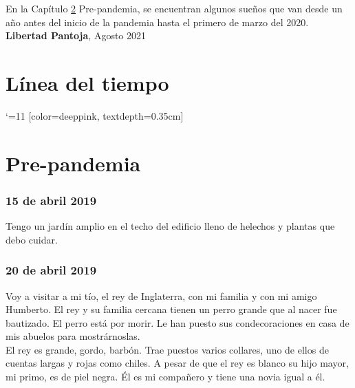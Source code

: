 \documentclass[12pt]{book}
\begin{document}
En la Capítulo \ref{prepandemia} Pre-pandemia, se encuentran algunos sueños que van desde un año antes del inicio de la pandemia hasta el primero de marzo del 2020. 
\vfill
\hfill {\textbf{Libertad Pantoja}, Agosto 2021}

\chapter{Línea del tiempo}

\catcode `\@=11
\def\chron@selectmonth#1{\ifcase#1\or enero\or febrero\or
marzo\or abril \or mayo \or junio \or julio \or agosto \or
septiembre \or octubre \or noviembre \or diciembre\fi}
\startchronology
[startyear=2019,stopyear=2022, color=lowpink]
[color=deeppink, textdepth=0.35cm]
\stopchronology


\chapter{Pre-pandemia}
\label{prepandemia}
\subsection*{\hfill 15 de abril 2019}

Tengo un jardín amplio en el techo del edificio lleno de helechos y plantas que debo cuidar.

\subsection*{\hfill 20 de abril 2019}

Voy a visitar a mi tío, el rey de Inglaterra, con mi familia y con mi amigo Humberto. El rey y su familia cercana tienen un perro grande que al nacer fue bautizado. El perro está por morir. Le han puesto sus condecoraciones en casa de mis abuelos para mostrárnoslas.
\\
El rey es grande, gordo, barbón. Trae puestos varios collares, uno de ellos de cuentas largas y rojas como chiles. A pesar de que el rey es blanco su hijo mayor, mi primo, es de piel negra. Él es mi compañero y tiene una novia igual a él.
\end{document}
